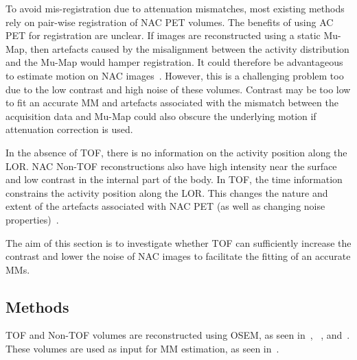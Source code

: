         To avoid mis-registration due to attenuation mismatches, most existing methods rely on pair-wise registration of \gls{NAC} \gls{PET} volumes. The benefits of using \gls{AC} \gls{PET} for registration are unclear. If images are reconstructed using a static \gls{Mu-Map}, then artefacts caused by the misalignment between the activity distribution and the \gls{Mu-Map} would hamper registration. It could therefore be advantageous to estimate motion on \gls{NAC} images~\parencite{LungMotionDiaphragmBaiBib, Kalantari2017AttenuationRegistration:, Dawood2008RespiratoryAlgorithms, Dawood2006LungImages}. However, this is a challenging problem too due to the low contrast and high noise of these volumes. Contrast may be too low to fit an accurate \gls{MM} and artefacts associated with the mismatch between the acquisition data and \gls{Mu-Map} could also obscure the underlying motion if attenuation correction is used.
        
        In the absence of \gls{TOF}, there is no information on the activity position along the \gls{LOR}. \gls{NAC} \gls{Non-TOF} reconstructions also have high intensity near the surface and low contrast in the internal part of the body. In \gls{TOF}, the time information constrains the activity position along the \gls{LOR}. This changes the nature and extent of the artefacts associated with \gls{NAC} \gls{PET} (as well as changing noise properties)~\parencite{Ter-Pogossian1981}.
        
        The aim of this section is to investigate whether \gls{TOF} can sufficiently increase the contrast and lower the noise of \gls{NAC} images to facilitate the fitting of an accurate \glspl{MM}.
        
        \subsection{Methods} \label{sec:impact_of_tof_on_respiratory_motion_model_estimation_using_pre_gated_no_intra_cycle_motion_nac_pet_methods}
            \gls{TOF} and \gls{Non-TOF} volumes are reconstructed using \gls{OSEM}, as seen in~, ~, and~. These volumes are used as input for \gls{MM} estimation, as seen in~.
            
